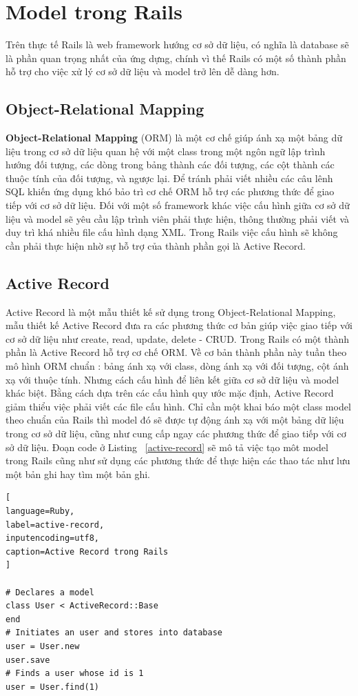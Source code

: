 \section{Model trong Rails}
Trên thực tế Rails là web framework hướng cơ sở dữ liệu, có nghĩa là database sẽ là phần quan trọng nhất của ứng dựng, chính vì thế Rails có một số thành phần hỗ trợ cho việc xử lý cơ sở dữ liệu và model trở lên dễ dàng hơn.

\subsection{Object-Relational Mapping}
{\bf Object-Relational Mapping} (ORM) là một cơ chế giúp ánh xạ một bảng dữ liệu trong cơ sở dữ liệu quan hệ với một class trong một ngôn ngữ lập trình hướng đối tượng, các dòng trong bảng thành các đối tượng, các cột thành các thuộc tính của đối tượng, và ngược lại.
\newline
Để tránh phải viết nhiều các câu lênh SQL khiến ứng dụng khó bảo trì cơ chế ORM hỗ trợ các phương thức để giao tiếp với cơ sở dữ liệu.
Đối với một số framework khác việc cấu hình giữa cơ sở dữ liệu và model sẽ yêu cầu lập trình viên phải thực hiện, thông thường phải viết và duy trì khá nhiều file cấu hình dạng XML. Trong Rails việc cấu hình 
sẽ không cần phải thực hiện nhờ sự hỗ trợ của thành phần gọi là Active Record.

\subsection{Active Record}
Active Record là một mẫu thiết kế sử dụng trong Object-Relational Mapping, mẫu thiết kế Active Record đưa ra các phương thức cơ bản giúp việc giao tiếp với cơ sở dữ liệu như create, read, update, delete - CRUD. \newline
Trong Rails có một thành phần là Active Record hỗ trợ cơ chế ORM. Về cơ bản thành phần này tuần theo mô hình ORM chuẩn : bảng ánh xạ với class, dòng ánh xạ với đối tượng, cột ánh xạ với thuộc tính. Nhưng cách cấu hình để liên kết giữa cơ sở dữ liệu và model khác biệt. Bằng cách dựa trên các cấu hình quy ước mặc định, Active Record giảm thiểu việc phải viết các file cấu hình.
Chỉ cần một khai báo một class model theo chuẩn của Rails thì model đó sẽ được tự động ánh xạ với một bảng dữ liệu trong cơ sở dữ liệu, cũng như cung cấp ngay các phương thức để giao tiếp với cơ sở dữ liệu. 
Đoạn code ở Listing ~\ref{active-record} sẽ mô tả việc tạo môt model trong Rails cũng như sử dụng các phương thức để thực hiện các thao tác như lưu một bản ghi hay tìm một bản ghi.
\begin{lstlisting}[
language=Ruby,
label=active-record,
inputencoding=utf8,
caption=Active Record trong Rails
]

# Declares a model
class User < ActiveRecord::Base
end
# Initiates an user and stores into database  
user = User.new
user.save
# Finds a user whose id is 1
user = User.find(1)
\end{lstlisting}

